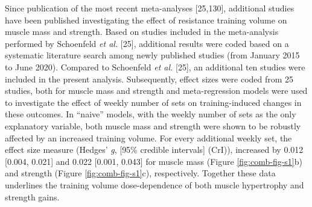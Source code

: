 \documentclass[twoside,10pt]{gihclass} %
\begin{document}
Since publication of the most recent meta-analyses {[}25,130{]},
additional studies have been published investigating the effect of resistance training volume on muscle mass and strength. Based on studies included in the meta-analysis performed by Schoenfeld \emph{et al.} {[}25{]}, additional results were coded based on a systematic literature search among newly published studies (from January 2015 to June 2020). Compared to Schoenfeld \emph{et al.} {[}25{]}, an additional ten studies were included in the present analysis.
Subsequently, effect sizes were coded from 25 studies, both for muscle mass and strength and meta-regression models were used to investigate the effect of weekly number of sets on training-induced changes in these outcomes.
In ``naive'' models, with the weekly number of sets as the only explanatory variable, both muscle mass and strength were shown to be robustly affected by an increased training volume.
For every additional weekly set, the effect size measure (Hedges' \emph{g}, {[}95\% credible intervals{]} (CrI)), increased by
0.012 {[}0.004, 0.021{]} and 0.022 {[}0.001, 0.043{]}
for muscle mass (Figure \ref{fig:comb-fig-s1}b)
and strength (Figure \ref{fig:comb-fig-s1}c),
respectively.
Together these data underlines the training volume dose-dependence of both muscle hypertrophy and strength gains.
\end{document}
